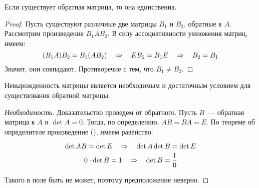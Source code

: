 
\begin{theorem}
	Если существует обратная матрица, то она единственна.
\end{theorem}
\begin{proof}
	Пусть существуют различные две матрицы $B_1$ и $B_2$, обратные к $A$.
	Рассмотрим произведение $B_1AB_2$. В силу ассоциативности умножения
	матриц, имеем:
	$$(B_1A)B_2=B_1(AB_2) \mathbin{\quad\Rightarrow \quad} EB_2=B_1E \mathbin{\quad\Rightarrow \quad} B_2=B_1$$
	Значит, они совпадают. Противоречие с тем, что $B_1\ne B_2$.
\end{proof}

\begin{theorem}
	Невырожденность матрицы является необходимым и достаточным условием
	для существования обратной матрицы.
\end{theorem}
\begin{proof}[Необходимость]
	Доказательство проведем от обратного. Пусть $B$~--- обратная
	матрица к $A$ и $\det A=0$. Тогда, по определению, $AB=BA=E$. По теореме об
	определителе произведение (), имеем равенство:

	$$\det AB=\det E \mathbin{\quad\Rightarrow \quad} \det A\det B=\det E$$
	$$0\cdot\det B=1 \mathbin{\quad\Rightarrow \quad} \det B=\frac10$$

	Такого в поле быть не может, поэтому предположение неверно.
\end{proof}
